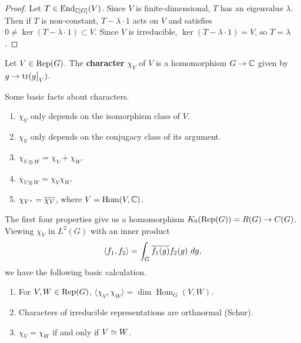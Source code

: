 \begin{proof}
Let $T \in \operatorname{End}_{\mathbb{C}[G]}(V)$. Since $V$ is finite-dimensional, $T$ has an
eigenvalue $\lambda$. Then if $T$ is non-constant, $T - \lambda \cdot 1$ acts 
on $V$ and satisfies $0 \neq \ker(T - \lambda \cdot 1) \subset V$. Since $V$ is
irreducible, $\ker(T -\lambda \cdot 1) = V$, so $T = \lambda$.
\end{proof}

\begin{defn}
Let $V \in \mathrm{Rep}(G)$. The \textbf{character} $\chi_V$ of $V$ is a homomorphism
$G \rightarrow \mathbb{C}$ given by $g \rightarrow \tr(\restr{g}{V})$.
\end{defn}

Some basic facts about characters.

\begin{enumerate}[1.]
\item $\chi_V$ only depends on the isomorphism class of $V$.
\item $\chi_V$ only depends on the conjugacy class of its argument.
\item $\chi_{V \oplus W} = \chi_V + \chi_W$.
\item $\chi_{V \otimes W} = \chi_V \chi_W$.
\item $\chi_{V^*} = \overline{\chi_V}$, where $V = \operatorname{Hom}(V, \mathbb{C})$.
\end{enumerate}

The first four properties give us a homomorphism
$K_0(\mathrm{Rep}(G)) = R(G) \rightarrow C(G)$. Viewing $\chi_V$ in $L^2(G)$ with an
inner product
\[ \langle f_1, f_2 \rangle = \int_G \overline{f_1(g)} f_2(g) \ dg, \]
we have the following basic calculation.

\begin{prop}
\begin{enumerate}[(1)]
\item For $V, W \in \mathrm{Rep}(G)$,
$\langle \chi_V, \chi_W \rangle = \dim \operatorname{Hom}_G (V, W).$
\item Characters of irreducible representations are orthnormal (Schur).
\item $\chi_V = \chi_W$ if and only if $V \simeq W$.
\end{enumerate}
\end{prop}
